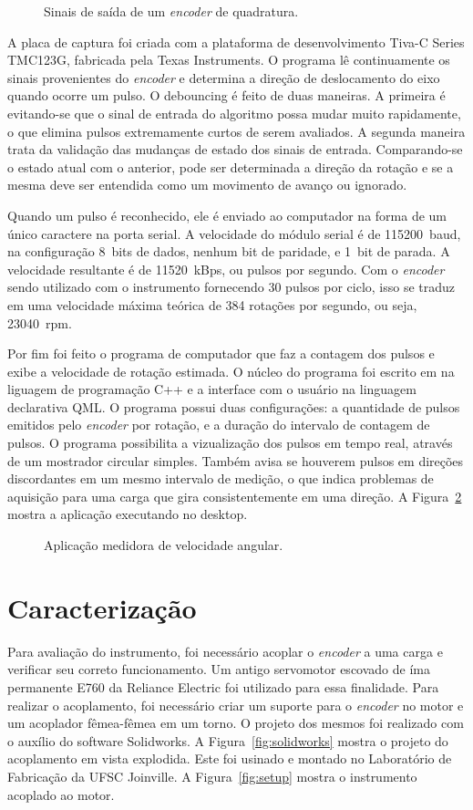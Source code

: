 \documentclass[a4paper,9pt,twocolumn]{article}
\newcommand{\fig}[4][ht!]{
  \begin{figure}[#1]
    {\centering{\texttt{[image: \#2]}}\par}
    \caption{#3}
    \label{fig:#2}
  \end{figure}
}
\begin{document}
\fig{quadrature}{Sinais de saída de um \emph{encoder} de quadratura.}{width=\columnwidth}

A placa de captura foi criada com a plataforma de desenvolvimento Tiva-C Series TMC123G, fabricada pela Texas Instruments.
O programa lê continuamente os sinais provenientes do \textit{encoder} e determina a direção de deslocamento do eixo quando ocorre um pulso. O debouncing é feito de duas maneiras. A primeira é evitando-se que o sinal de entrada do algoritmo possa mudar muito rapidamente, o que elimina pulsos extremamente curtos de serem avaliados. A segunda maneira trata da validação das mudanças de estado dos sinais de entrada. Comparando-se o estado atual com o anterior, pode ser determinada a direção da rotação e se a mesma deve ser entendida como um movimento de avanço ou ignorado. 

Quando um pulso é reconhecido, ele é enviado ao computador na forma de um único caractere na porta serial. A velocidade do módulo serial é de 115200~baud, 
na configuração 8~bits de dados, nenhum bit de paridade, e 1~bit de parada. A velocidade resultante é de 11520~kBps, ou pulsos por segundo. Com o \textit{encoder} sendo utilizado com o instrumento fornecendo 30 pulsos por ciclo, isso se traduz em uma velocidade máxima teórica de 384 rotações por segundo, ou seja, 23040~rpm.

Por fim foi feito o programa de computador que faz a contagem dos pulsos e exibe a velocidade de rotação estimada. O núcleo do programa foi escrito em na liguagem de programação C++ e a interface com o usuário na linguagem declarativa QML. O programa possui duas configurações: a quantidade de pulsos emitidos pelo \textit{encoder} por rotação, e a duração do intervalo de contagem de pulsos. O programa possibilita a vizualização dos pulsos em tempo real, através de um mostrador circular simples. Também avisa se houverem pulsos em direções discordantes em um mesmo intervalo de medição, o que indica problemas de aquisição para uma carga que gira consistentemente em uma direção. A Figura~\ref{fig:app1} mostra a aplicação executando no desktop. 

\fig{app1}{Aplicação medidora de velocidade angular.}{width=0.8\columnwidth}


\section{Caracterização}
Para avaliação do instrumento, foi necessário acoplar o \textit{encoder} a uma carga e verificar seu correto funcionamento. Um antigo servomotor escovado de íma permanente E760 da Reliance Electric foi utilizado para essa finalidade. Para realizar o acoplamento, foi necessário criar um suporte para o \textit{encoder} no motor e um acoplador fêmea-fêmea em um torno. O projeto dos mesmos foi realizado com o auxílio do software Solidworks. A Figura~\ref{fig:solidworks} mostra o projeto do acoplamento em vista explodida. Este foi usinado e montado no Laboratório de Fabricação da UFSC Joinville. A Figura~\ref{fig:setup} mostra o instrumento acoplado ao motor.
\end{document}
